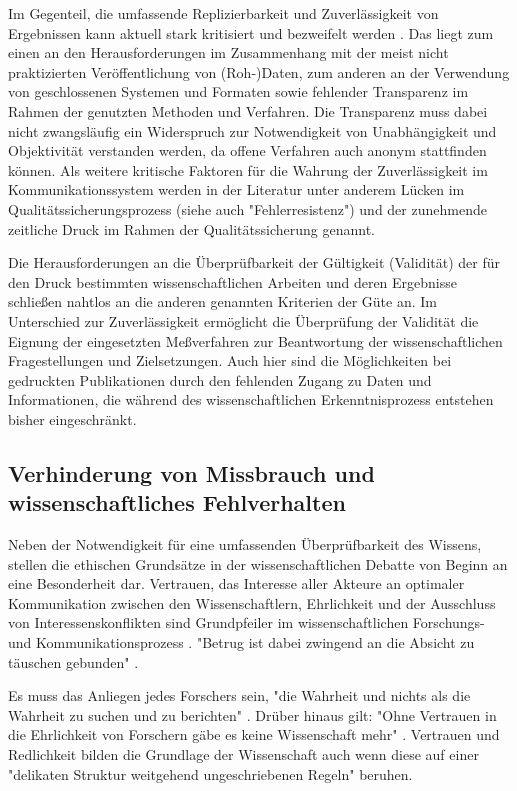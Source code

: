 Im Gegenteil, die umfassende Replizierbarkeit und Zuverlässigkeit von Ergebnissen kann aktuell stark kritisiert und bezweifelt werden \cite{Luescher_2014}. Das liegt zum einen an den Herausforderungen im Zusammenhang mit der meist nicht praktizierten Veröffentlichung von (Roh-)Daten, zum anderen an der Verwendung von geschlossenen Systemen und Formaten sowie fehlender Transparenz im Rahmen der genutzten Methoden und Verfahren. Die Transparenz muss dabei nicht zwangsläufig ein Widerspruch zur Notwendigkeit von Unabhängigkeit und Objektivität verstanden werden, da offene Verfahren auch anonym stattfinden können. Als weitere kritische Faktoren für die Wahrung der Zuverlässigkeit im Kommunikationssystem werden in der Literatur unter anderem Lücken im Qualitätssicherungsprozess (siehe auch "Fehlerresistenz") \cite{bar_2009_wissenschaftliche} und der zunehmende zeitliche Druck im Rahmen der Qualitätssicherung \cite{Luescher_2014} genannt.

Die Herausforderungen an die Überprüfbarkeit der Gültigkeit (Validität) der für den Druck bestimmten wissenschaftlichen Arbeiten und deren Ergebnisse schließen nahtlos an die anderen genannten Kriterien der Güte an. Im Unterschied zur Zuverlässigkeit ermöglicht die Überprüfung der Validität die Eignung der eingesetzten Meßverfahren zur Beantwortung der wissenschaftlichen Fragestellungen und Zielsetzungen. Auch hier sind die Möglichkeiten bei gedruckten Publikationen durch den fehlenden Zugang zu Daten und Informationen, die während des wissenschaftlichen Erkenntnisprozess entstehen bisher eingeschränkt.

\subsection{Verhinderung von Missbrauch und wissenschaftliches Fehlverhalten}

Neben der Notwendigkeit für eine umfassenden Überprüfbarkeit des Wissens, stellen die ethischen Grundsätze in der wissenschaftlichen Debatte von Beginn an eine Besonderheit dar. Vertrauen, das Interesse aller Akteure an optimaler Kommunikation zwischen den Wissenschaftlern, Ehrlichkeit und der Ausschluss von Interessenskonflikten sind Grundpfeiler im wissenschaftlichen Forschungs- und Kommunikationsprozess \cite{Bargheer_2015} \cite{wr_2015_wissenschaft_integritaet}. "Betrug ist dabei zwingend an die Absicht zu täuschen gebunden" \cite{Luescher_2014}.

Es muss das Anliegen jedes Forschers sein, "die Wahrheit und nichts als die Wahrheit zu suchen und zu berichten" \cite{Luescher_2014}. Drüber hinaus gilt: "Ohne Vertrauen in die Ehrlichkeit von Forschern gäbe es keine Wissenschaft mehr" \cite{hagner_2015_sache_buches}. Vertrauen und Redlichkeit bilden die Grundlage der Wissenschaft \cite{Bargheer_2015} auch wenn diese auf einer "delikaten Struktur weitgehend ungeschriebenen Regeln" \cite{grand_2012_open} beruhen.

